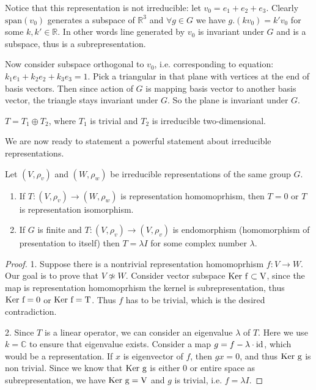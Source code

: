 \documentclass{amsart}
\def\ker{\rm Ker\ }
\def\id{\rm id}
\begin{document}
Notice that this representation is not irreducible: let $v_0 = e_1 + e_2 + e_3$.
Clearly $\text{span}(v_0)$ generates a subspace of $\mathbb{R}^3$ and $\forall g \in G$ we have $g. (k v_0) = k' v_0$ for some $k, k' \in \mathbb{R}$.
In other words line generated by $v_0$ is invariant under $G$ and is a subspace, thus is a subrepresentation.

Now consider subspace orthogonal to $v_0$, i.e. corresponding to equation:  $k_1 e_1 + k_2 e_2 + k_3 e_3 = 1$. 
Pick a triangular in that plane with vertices at the end of basis vectors.
Then since action of $G$ is mapping basis vector to another basis vector, the triangle stays invariant under $G$.
So the plane is invariant under $G$.

\begin{claim}
    $T = T_1 \oplus T_2$, where $T_1$ is trivial and $T_2$ is irreducible two-dimensional.
\end{claim}



We are now ready to statement a powerful statement about irreducible representations.

\begin{lemma}
    Let $(V, \rho_v)$ and $(W, \rho_w)$ be irreducible representations of the same group $G$.
    \begin{enumerate}
        \item If $T: (V, \rho_v) \to (W, \rho_w)$ is representation homomoprhism, then $T=0$ or $T$ is representation isomorphism.
        \item If $G$ is finite and $T : (V, \rho_v) \to (V, \rho_v) $ is endomorphism (homomorphism of presentation to itself) then $T = \lambda I$ for some complex number $\lambda$.
    \end{enumerate}
\end{lemma}
\begin{proof} 
    1. Suppose there is a nontrivial representation homomoprhism $f : V \to W$. Our goal is to prove that $V \not\simeq W$. Consider vector subspace $\ker f \subset V$, since the map is representation homomoprhism the kernel is subrepresentation, thus $\ker f = 0$ or $\ker f = T$. Thus $f$ has to be trivial, which is the desired contradiction. 
    
    2. Since $T$ is a linear operator, we can consider an eigenvalue $\lambda$ of $T$. 
    Here we use $k = \mathbb{C}$ to ensure that eigenvalue exists. 
    Consider a map $g = f - \lambda \cdot \id$, which would be a representation. 
    If $x$ is eigenvector of $f$, then $g x = 0$, and thus $\ker g$ is non trivial. Since we know that 
    $\ker g$ is either 0 or entire space as subrepresentation, we have $\ker g = V$ and $g$ is trivial, i.e. $f = \lambda I$.
\end{proof}
\end{document}
